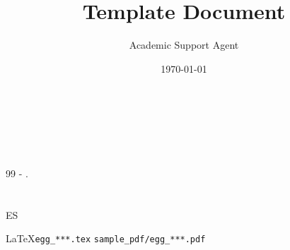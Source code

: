 \documentclass{article}
\title{Template Document}
\author{Academic Support Agent}
\date{\today}
\begin{document}
\maketitle


\section{ }

		 

	 

	 




\section{ }

\JSPSInstructions		%
\textbf{\\ \\
 \\
 }

	 

	\vspace{1cm}
	\begin{thebibliography}{99}
		   -  .
	\end{thebibliography}



\section{ }

	 ES 

	\LaTeX  \texttt{egg\_***.tex}  \texttt{sample\_pdf/egg\_***.pdf} 

\end{document}
